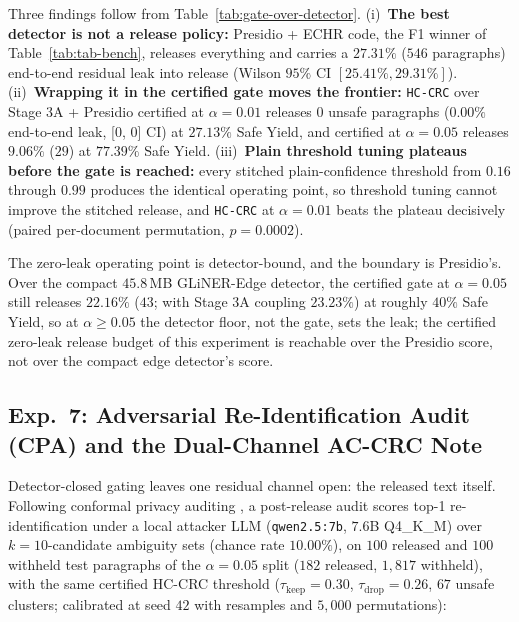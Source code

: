 \documentclass{article}
\begin{document}
Three findings follow from Table~\ref{tab:gate-over-detector}. (i)~\textbf{The best detector is not a release policy:} Presidio + ECHR code, the F1 winner of Table~\ref{tab:tab-bench}, releases everything and carries a $27.31\%$ ($546$ paragraphs) end-to-end residual leak into release (Wilson $95\%$ CI $[25.41\%, 29.31\%]$). (ii)~\textbf{Wrapping it in the certified gate moves the frontier:} \texttt{HC-CRC} over Stage 3A + Presidio certified at $\alpha{=}0.01$ releases $0$ unsafe paragraphs ($0.00\%$ end-to-end leak, [0, 0] CI) at $27.13\%$ Safe Yield, and certified at $\alpha{=}0.05$ releases $9.06\%$ ($29$) at $77.39\%$ Safe Yield. (iii)~\textbf{Plain threshold tuning plateaus before the gate is reached:} every stitched plain-confidence threshold from $0.16$ through $0.99$ produces the identical operating point, so threshold tuning cannot improve the stitched release, and \texttt{HC-CRC} at $\alpha{=}0.01$ beats the plateau decisively (paired per-document permutation, $p{=}0.0002$).

The zero-leak operating point is detector-bound, and the boundary is Presidio's. Over the compact $45.8$\,MB GLiNER-Edge detector, the certified gate at $\alpha{=}0.05$ still releases $22.16\%$ ($43$; with Stage 3A coupling $23.23\%$) at roughly $40\%$ Safe Yield, so at $\alpha \ge 0.05$ the detector floor, not the gate, sets the leak; the certified zero-leak release budget of this experiment is reachable over the Presidio score, not over the compact edge detector's score.

\subsection{Exp.~7: Adversarial Re-Identification Audit (CPA) and the Dual-Channel AC-CRC Note}
\label{sec:exp7}

Detector-closed gating leaves one residual channel open: the released text itself. Following conformal privacy auditing \citep{cpa2026auditing}, a post-release audit scores top-1 re-identification under a local attacker LLM (\texttt{qwen2.5:7b}, $7.6$B Q4\_K\_M) over $k{=}10$-candidate ambiguity sets (chance rate $10.00\%$), on $100$ released and $100$ withheld test paragraphs of the $\alpha{=}0.05$ split ($182$ released, $1{,}817$ withheld), with the same certified HC-CRC threshold ($\tau_{\text{keep}}{=}0.30$, $\tau_{\text{drop}}{=}0.26$, $67$ unsafe clusters; calibrated at seed $42$ with resamples and $5{,}000$ permutations):
\end{document}
